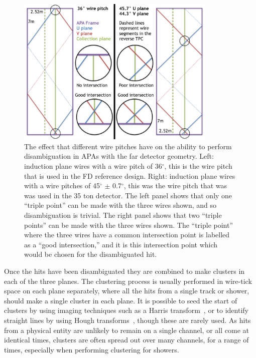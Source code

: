 \begin{figure}
  \centering
  \includegraphics[width=0.85\textwidth]{WireAngleCondition}
  \caption[Performing disambiguation with different wire pitches.]
          {The effect that different wire pitches have on the ability to perform disambiguation in APAs with the far detector geometry. Left: induction plane wires with a wire pitch of 36$^{\circ}$, this is the wire pitch that is used in the FD reference design. Right: induction plane wires with a wire pitches of 45$^{\circ}$ $\pm$ 0.7$^{\circ}$, this was the wire pitch that was was used in the 35 ton detector. The left panel shows that only one ``triple point'' can be made with the three wires shown, and so disambiguation is trivial. The right panel shows that two ``triple points'' can be made with the three wires shown. The ``triple point'' where the three wires have a common intersection point is labelled as a ``good intersection,'' and it is this intersection point which would be chosen for the disambiguated hit.}
  \label{fig:WirePitches}
\end{figure}

Once the hits have been disambiguated they are combined to make clusters in each of the three planes. The clustering process is usually performed in wire-tick space on each plane separately, where all the hits from a single track or shower, should make a single cluster in each plane. It is possible to seed the start of clusters by using imaging techniques such as a Harris transform~\citep{HarrisTrans}, or to identify straight lines by using Hough transforms~\citep{HoughTrans}, though these are rarely used. As hits from a physical entity are unlikely to remain on a single channel, or all come at identical times, clusters are often spread out over many channels, for a range of times, especially when performing clustering for showers. \\


